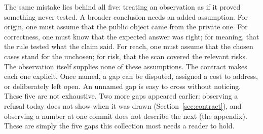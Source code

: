 \documentclass[11pt]{article}
\begin{document}
The same mistake lies behind all five: treating an observation as if it proved
something never tested. A broader conclusion needs an added assumption. For
origin, one must assume
that the public object came from the private one. For correctness, one must
know that the expected answer was right; for meaning, that the rule tested
what the claim said. For reach, one must assume that the chosen cases stand
for the unchosen; for risk, that the scan covered the relevant risks. The
observation itself supplies none of these assumptions. The contract makes
each one explicit. Once named, a gap can be disputed, assigned a cost to
address, or deliberately left open. An unnamed gap is easy to cross without
noticing. These five are not exhaustive. Two more gaps appeared earlier:
observing a refusal today does not show when it was drawn
(Section~\ref{sec:contract}), and observing a number at one commit does not
describe the next (the appendix). These are simply the five gaps this
collection most needs a reader to hold.
\end{document}
